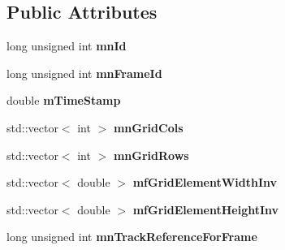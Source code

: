 \subsection*{Public Attributes}
\begin{DoxyCompactItemize}
\item 
long unsigned int {\bfseries mn\+Id}\hypertarget{classMultiColSLAM_1_1cMultiKeyFrame_ab5a8354760bcd604c95421c250668ffd}{}\label{classMultiColSLAM_1_1cMultiKeyFrame_ab5a8354760bcd604c95421c250668ffd}

\item 
long unsigned int {\bfseries mn\+Frame\+Id}\hypertarget{classMultiColSLAM_1_1cMultiKeyFrame_a80c44e1dc61f0586eeae056472352227}{}\label{classMultiColSLAM_1_1cMultiKeyFrame_a80c44e1dc61f0586eeae056472352227}

\item 
double {\bfseries m\+Time\+Stamp}\hypertarget{classMultiColSLAM_1_1cMultiKeyFrame_a6e6b63f7b262db5ed5604a88823e5a38}{}\label{classMultiColSLAM_1_1cMultiKeyFrame_a6e6b63f7b262db5ed5604a88823e5a38}

\item 
std\+::vector$<$ int $>$ {\bfseries mn\+Grid\+Cols}\hypertarget{classMultiColSLAM_1_1cMultiKeyFrame_aa74ed995d88e5f5603946fcd7fa3c8ef}{}\label{classMultiColSLAM_1_1cMultiKeyFrame_aa74ed995d88e5f5603946fcd7fa3c8ef}

\item 
std\+::vector$<$ int $>$ {\bfseries mn\+Grid\+Rows}\hypertarget{classMultiColSLAM_1_1cMultiKeyFrame_a39b2f133b4e2dc991b9796d13a2118a3}{}\label{classMultiColSLAM_1_1cMultiKeyFrame_a39b2f133b4e2dc991b9796d13a2118a3}

\item 
std\+::vector$<$ double $>$ {\bfseries mf\+Grid\+Element\+Width\+Inv}\hypertarget{classMultiColSLAM_1_1cMultiKeyFrame_acf423a36a5f40b2f5f097fb3fd3dca9c}{}\label{classMultiColSLAM_1_1cMultiKeyFrame_acf423a36a5f40b2f5f097fb3fd3dca9c}

\item 
std\+::vector$<$ double $>$ {\bfseries mf\+Grid\+Element\+Height\+Inv}\hypertarget{classMultiColSLAM_1_1cMultiKeyFrame_ae1958d9a3878cb2f8d65a04078ed94a2}{}\label{classMultiColSLAM_1_1cMultiKeyFrame_ae1958d9a3878cb2f8d65a04078ed94a2}

\item 
long unsigned int {\bfseries mn\+Track\+Reference\+For\+Frame}\hypertarget{classMultiColSLAM_1_1cMultiKeyFrame_a6aa112103788744e1e4eae640eb23993}{}\label{classMultiColSLAM_1_1cMultiKeyFrame_a6aa112103788744e1e4eae640eb23993}


\end{DoxyCompactItemize}
